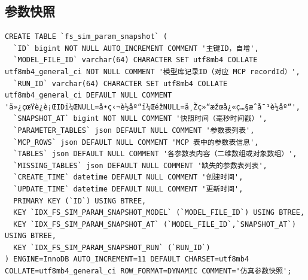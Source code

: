 \subsection{参数快照}
{\scriptsize
\begin{verbatim}
CREATE TABLE `fs_sim_param_snapshot` (
  `ID` bigint NOT NULL AUTO_INCREMENT COMMENT '主键ID，自增',
  `MODEL_FILE_ID` varchar(64) CHARACTER SET utf8mb4 COLLATE utf8mb4_general_ci NOT NULL COMMENT '模型库记录ID（对应 MCP recordId）',
  `RUN_ID` varchar(64) CHARACTER SET utf8mb4 COLLATE utf8mb4_general_ci DEFAULT NULL COMMENT 'ä»¿çœŸè¿è¡ŒIDï¼ŒNULL=å•ç‹¬è½åº“ï¼ŒéžNULL=ä¸Žç»“æžœå¿«ç…§æˆå¯¹è½åº“',
  `SNAPSHOT_AT` bigint NOT NULL COMMENT '快照时间（毫秒时间戳）',
  `PARAMETER_TABLES` json DEFAULT NULL COMMENT '参数表列表',
  `MCP_ROWS` json DEFAULT NULL COMMENT 'MCP 表中的参数表信息',
  `TABLES` json DEFAULT NULL COMMENT '各参数表内容（二维数组或对象数组）',
  `MISSING_TABLES` json DEFAULT NULL COMMENT '缺失的参数表列表',
  `CREATE_TIME` datetime DEFAULT NULL COMMENT '创建时间',
  `UPDATE_TIME` datetime DEFAULT NULL COMMENT '更新时间',
  PRIMARY KEY (`ID`) USING BTREE,
  KEY `IDX_FS_SIM_PARAM_SNAPSHOT_MODEL` (`MODEL_FILE_ID`) USING BTREE,
  KEY `IDX_FS_SIM_PARAM_SNAPSHOT_AT` (`MODEL_FILE_ID`,`SNAPSHOT_AT`) USING BTREE,
  KEY `IDX_FS_SIM_PARAM_SNAPSHOT_RUN` (`RUN_ID`)
) ENGINE=InnoDB AUTO_INCREMENT=11 DEFAULT CHARSET=utf8mb4 COLLATE=utf8mb4_general_ci ROW_FORMAT=DYNAMIC COMMENT='仿真参数快照';
\end{verbatim}
}


